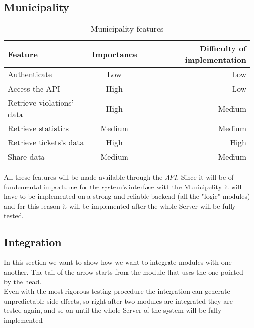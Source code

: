         \subsection{Municipality}
        \begin{table}[h!]
            \begin{center}
            
            \begin{tabular}{l|c|r} %
                \textbf{Feature} & \textbf{Importance} & \textbf{Difficulty of implementation}\\
                
                \hline
                Authenticate & Low & Low\\
                Access the API & High & Low\\
                Retrieve violations' data & High & Medium\\
                Retrieve statistics & Medium & Medium\\
                Retrieve tickets's data & High & High\\
                Share data & Medium & Medium\\

            \end{tabular}
            \caption{Municipality features}
            \label{tab:table1}
            \end{center}
        \end{table}

        All these features will be made available through the \emph{API}. Since it will be of fundamental importance for the 
        system's interface with the Municipality it will have to be implemented on a strong and reliable backend (all the 
        "logic" modules) and for this reason it will be implemented after the whole Server will be fully tested.\\

    \subsection{Integration}

        In this section we want to show how we want to integrate modules with one another. The tail of the arrow starts from the module 
        that uses the one pointed by the head.\\
        Even with the most rigorous testing procedure the integration can generate unpredictable side effects, so right after two modules 
        are integrated they are tested again, and so on until the whole Server of the system will be fully implemented.

